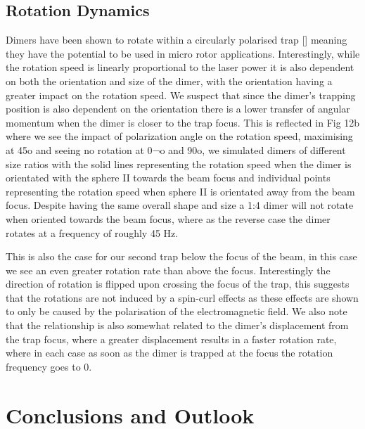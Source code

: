 \documentclass[preprint,  3p]{elsarticle}
\begin{document}
\subsection{Rotation Dynamics}

Dimers have been shown to rotate within a circularly polarised trap [] meaning they have the potential to be used in micro rotor applications. Interestingly, while the rotation speed is linearly proportional to the laser power it is also dependent on both the orientation and size of the dimer, with the orientation having a greater impact on the rotation speed. We suspect that since the dimer’s trapping position is also dependent on the orientation there is a lower transfer of angular momentum when the dimer is closer to the trap focus. This is reflected in Fig 12b where we see the impact of polarization angle on the rotation speed, maximising at 45o and seeing no rotation at 0¬o and 90o, we simulated dimers of different size ratios with the solid lines representing the rotation speed when the dimer is orientated with the sphere II towards the beam focus and individual points representing the rotation speed when sphere II is orientated away from the beam focus. Despite having the same overall shape and size a 1:4 dimer will not rotate when oriented towards the beam focus, where as the reverse case the dimer rotates at a frequency of roughly 45 Hz. 

This is also the case for our second trap below the focus of the beam, in this case we see an even greater rotation rate than above the focus. Interestingly the direction of rotation is flipped upon crossing the focus of the trap, this suggests that the rotations are not induced by a spin-curl effects as these effects are shown to only be caused by the polarisation of the electromagnetic field. We also note that the relationship is also somewhat related to the dimer’s displacement from the trap focus, where a greater displacement results in a faster rotation rate, where in each case as soon as the dimer is trapped at the focus the rotation frequency goes to 0.


\section{Conclusions and Outlook}
	
\end{document}
